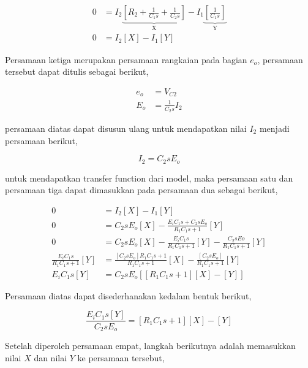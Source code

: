 \documentclass[12pt]{journal}
\begin{document}
\begin{equation}
    \begin{split}
        0 &= I_2\underbrace{[R_2+\frac{1}{C_1s}+\frac{1}{C_2s}]}_{\text{X}}-I_1\underbrace{[\frac{1}{C_1s}]}_{\text{Y}}\\[5pt]
        0 &= I_2[X]-I_1[Y]
    \end{split}
\end{equation}

Persamaan ketiga merupakan persamaan rangkaian pada bagian $e_o$, persamaan tersebut dapat ditulis sebagai berikut,

\begin{equation*}
    \begin{split}
        e_o &= V_{C2} \\[5pt]
        E_o &= \frac{1}{C_2s}I_2
    \end{split}
\end{equation*}

persamaan diatas dapat disusun ulang untuk mendapatkan nilai $I_2$ menjadi persamaan berikut,

\begin{equation}
    I_2 = C_2sE_o
\end{equation}

untuk mendapatkan transfer function dari model, maka persamaan satu dan persamaan tiga dapat dimasukkan pada persamaan dua sebagai berikut,

\begin{equation*}
    \begin{split}
        0 &= I_2[X]-I_1[Y] \\[5pt]
        0 &= C_2sE_o[X]-\frac{E_iC_1s+C_2sE_o}{R_1C_1s+1}[Y] \\[5pt]
        0 &= C_2sE_o[X]-\frac{E_iC_1s}{R_1C_1s+1}[Y]-\frac{C_2sEo}{R_1C_1s+1}[Y] \\[5pt]
        \frac{E_iC_1s}{R_1C_1s+1}[Y] &= \frac{[C_2sE_o]R_1C_1s+1}{R_1C_1s+1}[X]-\frac{[C_2sE_o]}{R_1C_1s+1}[Y] \\[5pt]
        E_iC_1s[Y] &= C_2sE_o[[R_1C_1s+1][X]-[Y]]
    \end{split}
\end{equation*}

Persamaan diatas dapat disederhanakan kedalam bentuk berikut,

\begin{equation}
    \frac{E_iC_1s[Y]}{C_2sE_o} = [R_1C_1s+1][X]-[Y]
\end{equation}

Setelah diperoleh persamaan empat, langkah berikutnya adalah memasukkan nilai $X$ dan nilai $Y$ ke persamaan tersebut,
\end{document}
